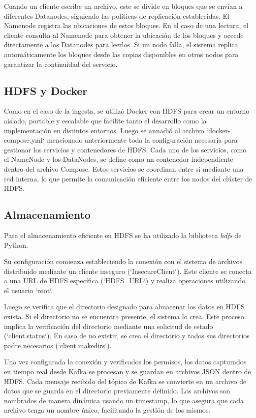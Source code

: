 \documentclass{article}
\begin{document}
Cuando un cliente escribe un archivo, este se divide en bloques que se envían a diferentes Datanodes, siguiendo las políticas de replicación establecidas. El Namenode registra las ubicaciones de estos bloques. En el caso de una lectura, el cliente consulta al Namenode para obtener la ubicación de los bloques y accede directamente a los Datanodes para leerlos. Si un nodo falla, el sistema replica automáticamente los bloques desde las copias disponibles en otros nodos para garantizar la continuidad del servicio.

\subsection{HDFS y Docker}

Como en el caso de la ingesta, se utilizó Docker con HDFS para crear un entorno aislado, portable y escalable que facilite tanto el desarrollo como la implementación en distintos entornos.
Luego se annadió al archivo `docker-compose.yml` mencionado anteriormente toda la configuración necesaria para gestionar los servicios y contenedores de HDFS.
Cada uno de los servicios, como el NameNode y los DataNodes, se define como un contenedor independiente dentro del archivo Compose. Estos servicios se coordinan entre sí mediante una red interna, lo que permite la comunicación eficiente entre los nodos del clúster de HDFS.

\subsection{Almacenamiento}

Para el almacenamiento eficiente en HDFS se ha utilizado la biblioteca \textit{hdfs} de Python.

Su configuración comienza estableciendo la conexión con el sistema de archivos distribuido mediante un cliente inseguro (`InsecureClient`). Este cliente se conecta a una URL de HDFS específica (`HDFS\_URL`) y realiza operaciones utilizando el usuario `root`.

Luego se verifica que el directorio designado para almacenar los datos en HDFS exista. Si el directorio no se encuentra presente, el sistema lo crea. Este proceso implica la verificación del directorio mediante una solicitud de estado (`client.status`). En caso de no existir, se crea el directorio y todos sus directorios padre necesarios (`client.makedirs`).

Una vez configurada la conexión y verificados los permisos, los datos capturados en tiempo real desde Kafka se procesan y se guardan en archivos JSON dentro de HDFS. Cada mensaje recibido del tópico de Kafka se convierte en un archivo de datos que se guarda en el directorio previamente definido. Los archivos son nombrados de manera dinámica usando un timestamp, lo que asegura que cada archivo tenga un nombre único, facilitando la gestión de los mismos.
\end{document}
